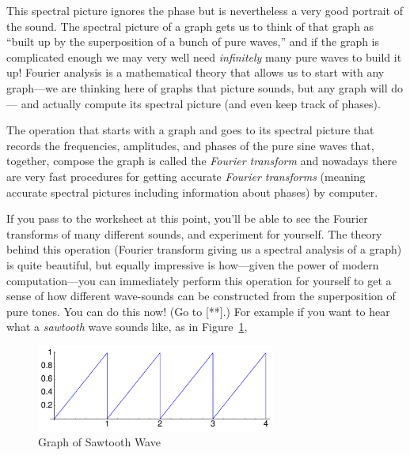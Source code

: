 \documentclass[11pt]{article}
\theoremstyle{plain}
\theoremstyle{definition}
\numberwithin{equation}{section}
\numberwithin{figure}{section}
\numberwithin{table}{section}
\begin{document}
This spectral picture ignores the phase but is nevertheless a very
good portrait of the sound.  The spectral picture of a graph gets us
to think of that graph as ``built up by the superposition of a bunch
of pure waves,'' and if the graph is complicated enough we may very well
need {\em infinitely} many pure waves to build it up!  Fourier analysis is a
mathematical theory that allows us to start with any graph---we are
thinking here of graphs that picture sounds, but any graph will do---
and actually compute its spectral picture (and even keep track of
phases).
 
 
The operation that starts with a graph and goes to its spectral
picture that records the frequencies, amplitudes, and phases of the
pure sine waves that, together, compose the graph is called the {\em
  Fourier transform} and nowadays there are very fast procedures for
getting accurate {\em Fourier transforms} (meaning accurate spectral
pictures including information about phases) by computer.
 
 
If you pass to the worksheet at this point, you'll be able to see the
Fourier transforms of many different sounds, and experiment for
yourself.  The theory behind this operation (Fourier transform giving
us a spectral analysis of a graph) is quite beautiful, but equally
impressive is how---given the power of modern computation---you can
immediately perform this operation for yourself to get a sense of how
different wave-sounds can be constructed from the superposition of
pure tones.  You can do this now!  (Go to [**].)  For example if you
want to hear what a {\em sawtooth} wave sounds like, as in
Figure~\ref{fig:sawtooth}, 
   
   
\begin{figure}[H]
\begin{center}
\includegraphics[width=0.7\textwidth]{illustrations/sawtooth}
\end{center}
\caption{Graph of Sawtooth Wave\label{fig:sawtooth}}
\end{figure}
\end{document}
